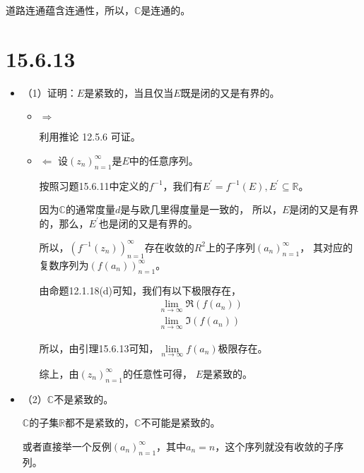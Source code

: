 \documentclass{article}
\begin{document}
道路连通蕴含连通性，所以，$\mathbb{C}$是连通的。

\section*{15.6.13}


\begin{itemize}
  \item （1）证明：$E$是紧致的，当且仅当$E$既是闭的又是有界的。
        \begin{itemize}
          \item $\Rightarrow$

                利用推论 12.5.6 可证。

          \item $\Leftarrow$
                设$(z_n)_{n = 1}^\infty$是$E$中的任意序列。

                按照习题15.6.11中定义的$f^{-1}$，我们有$E^\prime = f^{-1}(E), E^\prime \subseteq \mathbb{R}$。

                因为$\mathbb{C}$的通常度量$d$是与欧几里得度量是一致的，
                所以，$E$是闭的又是有界的，那么，$E^\prime$也是闭的又是有界的。

                所以，$(f^{-1}(z_n))_{n = 1}^\infty$存在收敛的$R^2$上的子序列$(a_n)_{n = 1}^\infty$，
                其对应的复数序列为$(f(a_n))_{n = 1}^\infty$。

                由命题12.1.18(d)可知，我们有以下极限存在，
                \begin{align*}
                  \lim\limits_{n \to \infty} \mathfrak{R} (f(a_n)) \\
                  \lim\limits_{n \to \infty} \mathfrak{I} (f(a_n))
                \end{align*}

                所以，由引理15.6.13可知，$\lim\limits_{n \to \infty} f(a_n)$极限存在。

                综上，由$(z_n)_{n = 1}^\infty$的任意性可得， $E$是紧致的。
        \end{itemize}

  \item （2）$\mathbb{C}$不是紧致的。

        $\mathbb{C}$的子集$\mathbb{R}$都不是紧致的，$\mathbb{C}$不可能是紧致的。

        或者直接举一个反例$(a_n)_{n = 1}^\infty$，其中$a_n = n$，这个序列就没有收敛的子序列。

\end{itemize}
\end{document}
